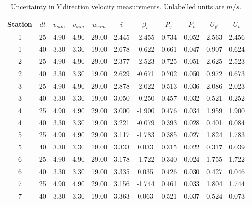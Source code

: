 \begin{table}[H]
\begin{center}
\begin{tabular}{|ccccccccccc|}
	\hline
	Station & $dt$ & $u_{sim}$ & $v_{sim}$ & $w_{sim}$ & $\bar{v}$ & $\beta_v$ & $P_{v^{\prime}}$ & $P_{\bar{v}}$ & $U_{v^{\prime}}$ & $U_{\bar{v}}$\\
	\hline
	1 & 25 & 4.90 & 4.90 & 29.00 & 2.445 & -2.455 & 0.734 & 0.052 & 2.563 & 2.456\\
	1 & 40 & 3.30 & 3.30 & 19.00 & 2.678 & -0.622 & 0.661 & 0.047 & 0.907 & 0.624\\
	2 & 25 & 4.90 & 4.90 & 29.00 & 2.377 & -2.523 & 0.725 & 0.051 & 2.625 & 2.523\\
	2 & 40 & 3.30 & 3.30 & 19.00 & 2.629 & -0.671 & 0.702 & 0.050 & 0.972 & 0.673\\
	3 & 25 & 4.90 & 4.90 & 29.00 & 2.878 & -2.022 & 0.513 & 0.036 & 2.086 & 2.023\\
	3 & 40 & 3.30 & 3.30 & 19.00 & 3.050 & -0.250 & 0.457 & 0.032 & 0.521 & 0.252\\
	4 & 25 & 4.90 & 4.90 & 29.00 & 3.000 & -1.900 & 0.476 & 0.034 & 1.959 & 1.900\\
	4 & 40 & 3.30 & 3.30 & 19.00 & 3.221 & -0.079 & 0.393 & 0.028 & 0.401 & 0.084\\
	5 & 25 & 4.90 & 4.90 & 29.00 & 3.117 & -1.783 & 0.385 & 0.027 & 1.824 & 1.783\\
	5 & 40 & 3.30 & 3.30 & 19.00 & 3.333 & 0.033 & 0.315 & 0.022 & 0.317 & 0.039\\
	6 & 25 & 4.90 & 4.90 & 29.00 & 3.178 & -1.722 & 0.340 & 0.024 & 1.755 & 1.722\\
	6 & 40 & 3.30 & 3.30 & 19.00 & 3.335 & 0.035 & 0.426 & 0.030 & 0.427 & 0.046\\
	7 & 25 & 4.90 & 4.90 & 29.00 & 3.156 & -1.744 & 0.461 & 0.033 & 1.804 & 1.744\\
	7 & 40 & 3.30 & 3.30 & 19.00 & 3.363 & 0.063 & 0.521 & 0.037 & 0.524 & 0.073\\
	\hline
\end{tabular}
\caption{Uncertainty in $Y$ direction velocity measurements. Unlabelled units are $m/s$.}
\label{table:uncertainties_v}
\end{center}
\end{table}
